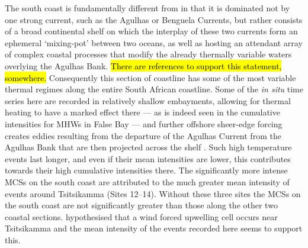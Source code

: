 \documentclass[a4paper,10pt,review]{elsarticle}
\begin{document}
The south coast is fundamentally different from in that it is dominated not by one strong current, such as the Agulhas or Benguela Currents, but rather consists of a broad continental shelf on which the interplay of these two currents form an ephemeral `mixing-pot' between two oceans, as well as hosting an attendant array of complex coastal processes that modify the already thermally variable waters overlying the Agulhas Bank. \hl{There are references to support this statement, somewhere.} Consequently this section of coastline has some of the most variable thermal regimes along the entire South African coastline. Some of the \emph{in situ} time series here are recorded in relatively shallow embayments, allowing for thermal heating to have a marked effect there --- as is indeed seen in the cumulative intensities for MHWs in False Bay --- and further offshore sheer-edge forcing creates eddies resulting from the departure of the Agulhas Current from the Agulhas Bank that are then projected across the shelf \citep{Roberts2005}. Such high temperature events last longer, and even if their mean intensities are lower, this contributes towards their high cumulative intensities there. The significantly more intense MCSs on the south coast are attributed to the much greater mean intensity of events around Tsitsikamma (Sites 12--14). Without these three sites the MCSs on the south coast are not significantly greater than those along the other two coastal sections. \citep{Roberts2005} hypothesised that a wind forced upwelling cell occurs near Tsitsikamma and the mean intensity of the events recorded here seems to support this.
\end{document}
